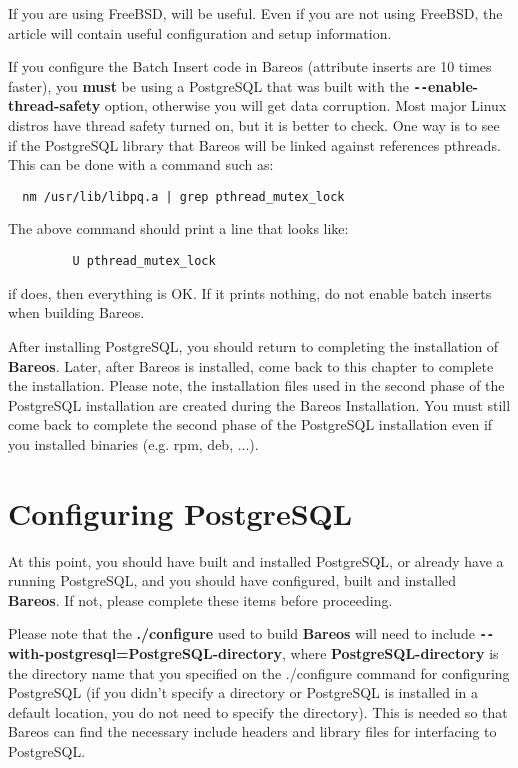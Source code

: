 If you are using FreeBSD,
will be useful. Even if you are not using FreeBSD, the article will contain
useful configuration and setup information.

If you configure the Batch Insert code in Bareos (attribute inserts are
10 times faster), you {\bf must} be using a PostgreSQL that was built with
the {\bf \verb:--:enable-thread-safety} option, otherwise you will get
data corruption. Most major Linux distros have thread safety turned on, but
it is better to check.  One way is to see if the PostgreSQL library that
Bareos will be linked against references pthreads.  This can be done
with a command such as:

\footnotesize
\begin{verbatim}
  nm /usr/lib/libpq.a | grep pthread_mutex_lock
\end{verbatim}
\normalsize

The above command should print a line that looks like:

\footnotesize
\begin{verbatim}
         U pthread_mutex_lock
\end{verbatim}
\normalsize

if does, then everything is OK. If it prints nothing, do not enable batch
inserts when building Bareos.

After installing PostgreSQL, you should return to completing the installation
of {\bf Bareos}. Later, after Bareos is installed, come back to this chapter
to complete the installation. Please note, the installation files used in the
second phase of the PostgreSQL installation are created during the Bareos
Installation. You must still come back to complete the second phase of the
PostgreSQL installation even if you installed binaries (e.g. rpm, deb,
...).


\label{PostgreSQL_configure}
\section{Configuring PostgreSQL}

At this point, you should have built and installed PostgreSQL, or already have
a running PostgreSQL, and you should have configured, built and installed {\bf
Bareos}. If not, please complete these items before proceeding.

Please note that the {\bf ./configure} used to build {\bf Bareos} will need to
include {\bf \verb:--:with-postgresql=PostgreSQL-directory}, where {\bf
PostgreSQL-directory} is the directory name that you specified on the
./configure command for configuring PostgreSQL (if you didn't specify a
directory or PostgreSQL is installed in a default location, you do not need to
specify the directory). This is needed so that Bareos can find the necessary
include headers and library files for interfacing to PostgreSQL.


